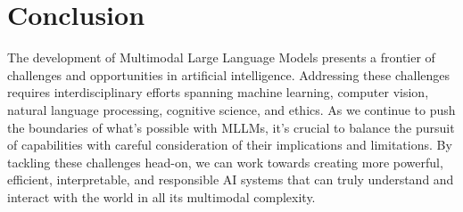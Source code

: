 \section{Conclusion}
The development of Multimodal Large Language Models presents a frontier of challenges and opportunities in artificial intelligence. Addressing these challenges requires interdisciplinary efforts spanning machine learning, computer vision, natural language processing, cognitive science, and ethics. As we continue to push the boundaries of what's possible with MLLMs, it's crucial to balance the pursuit of capabilities with careful consideration of their implications and limitations. By tackling these challenges head-on, we can work towards creating more powerful, efficient, interpretable, and responsible AI systems that can truly understand and interact with the world in all its multimodal complexity.



